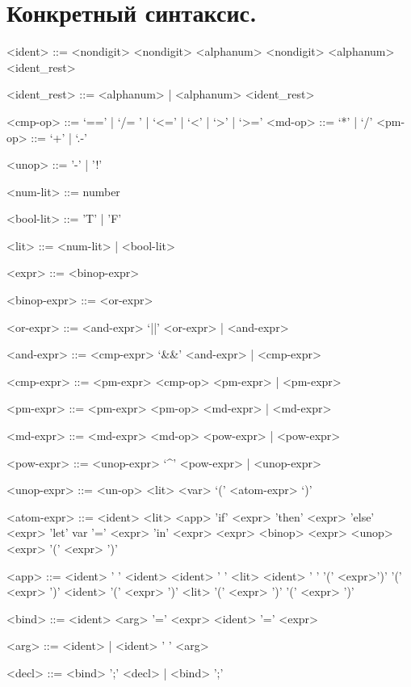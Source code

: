\documentclass[12pt, a4paper] {ncc}
\begin{document}
\setcounter{figure}{0}

\section{Конкретный синтаксис.}
\begin{grammar}
<ident> ::= <nondigit> \alt <nondigit> <alphanum> \alt <nondigit> <alphanum> <ident_rest>

<ident_rest> ::= <alphanum> | <alphanum> <ident_rest>

<cmp-op> ::= `==' | `/= ' | `<=' | `<' | `>' | `>=' 
<md-op> ::= `*' | `/' 
<pm-op> ::= `+' | `.-' 

<unop> ::= '-' | '!'

<num-lit> ::= number

<bool-lit> ::= 'T' | 'F'

<lit> ::= <num-lit> | <bool-lit>

<expr> ::= <binop-expr>

<binop-expr> ::= <or-expr>

<or-expr> ::= <and-expr> `||' <or-expr> | <and-expr>

<and-expr> ::= <cmp-expr> `&&' <and-expr> | <cmp-expr>

<cmp-expr> ::= <pm-expr> <cmp-op> <pm-expr> | <pm-expr>

<pm-expr> ::= <pm-expr> <pm-op> <md-expr> | <md-expr>

<md-expr> ::= <md-expr> <md-op> <pow-expr> | <pow-expr>

<pow-expr> ::= <unop-expr> `^' <pow-expr> | <unop-expr>

<unop-expr> ::= <un-op> <lit>
 <var>
 `(' <atom-expr> `)'

<atom-expr> ::= <ident>
\alt <lit>
\alt <app>
\alt 'if' <expr> 'then' <expr> 'else' <expr>
\alt 'let' var '=' <expr> 'in' <expr>
\alt  <expr> <binop> <expr>
\alt <unop> <expr>
\alt '(' <expr> ')'

<app> ::=  <ident> ' ' <ident>
\alt <ident> ' ' <lit>
\alt <ident> ' ' '(' <expr>')'
\alt '(' <expr> ')' <ident>
\alt '(' <expr> ')' <lit>
\alt '(' <expr> ')' '(' <expr> ')'

<bind> ::= <ident> <arg> '=' <expr>
\alt <ident> '=' <expr>

<arg> ::= <ident> | <ident> ' ' <arg>

<decl> ::= <bind> ';' <decl> | <bind> ';'

\end{grammar}
\end{document}
